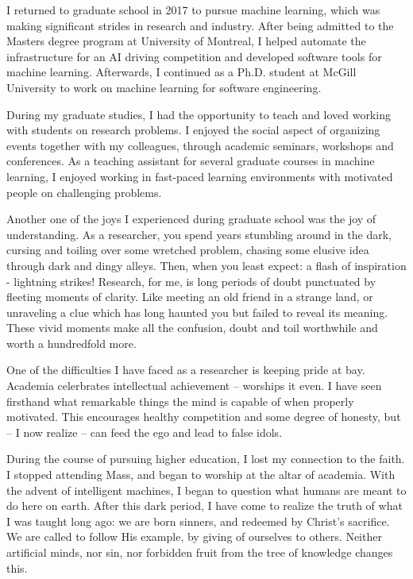 \documentclass[11pt]{article}
\begin{document}
I returned to graduate school in 2017 to pursue machine learning, which was making significant strides in research and industry. After being admitted to the Masters degree program at University of Montreal, I helped automate the infrastructure for an AI driving competition and developed software tools for machine learning. Afterwards, I continued as a Ph.D. student at McGill University to work on machine learning for software engineering.

During my graduate studies, I had the opportunity to teach and loved working with students on research problems. I enjoyed the social aspect of organizing events together with my colleagues, through academic seminars, workshops and conferences. As a teaching assistant for several graduate courses in machine learning, I enjoyed working in fast-paced learning environments with motivated people on challenging problems.

Another one of the joys I experienced during graduate school was the joy of understanding. As a researcher, you spend years stumbling around in the dark, cursing and toiling over some wretched problem, chasing some elusive idea through dark and dingy alleys. Then, when you least expect: a flash of inspiration - lightning strikes! Research, for me, is long periods of doubt punctuated by fleeting moments of clarity. Like meeting an old friend in a strange land, or unraveling a clue which has long haunted you but failed to reveal its meaning. These vivid moments make all the confusion, doubt and toil worthwhile and worth a hundredfold more.

One of the difficulties I have faced as a researcher is keeping pride at bay. Academia celerbrates intellectual achievement -- worships it even. I have seen firsthand what remarkable things the mind is capable of when properly motivated. This encourages healthy competition and some degree of honesty, but -- I now realize -- can feed the ego and lead to false idols.

During the course of pursuing higher education, I lost my connection to the faith. I stopped attending Mass, and began to worship at the altar of academia. With the advent of intelligent machines, I began to question what humans are meant to do here on earth. After this dark period, I have come to realize the truth of what I was taught long ago: we are born sinners, and redeemed by Christ's sacrifice. We are called to follow His example, by giving of ourselves to others. Neither artificial minds, nor sin, nor forbidden fruit from the tree of knowledge changes this.
\end{document}
